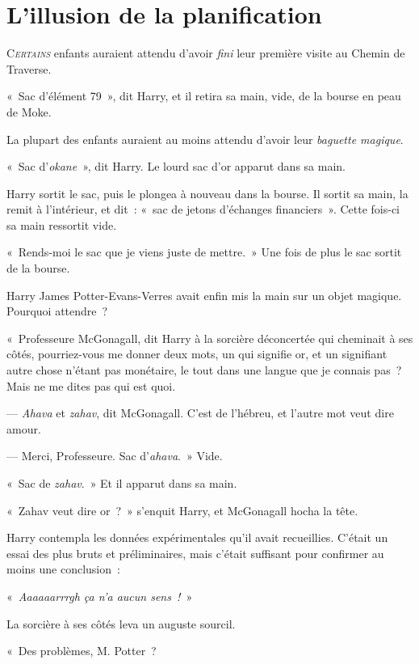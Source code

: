 
\chapter{L'illusion de la planification}

\lettrine{C}{\emph{ertains}} enfants auraient attendu d'avoir \emph{fini} leur première visite au Chemin de Traverse.

«~Sac d'élément 79~», dit Harry, et il retira sa main, vide, de la bourse en peau de Moke.

La plupart des enfants auraient au moins attendu d'avoir leur \emph{baguette magique}.

«~Sac d'\emph{okane}~», dit Harry. Le lourd sac d'or apparut dans sa main.

Harry sortit le sac, puis le plongea à nouveau dans la bourse. Il sortit sa main, la remit à l'intérieur, et dit~: «~sac de jetons d'échanges financiers~». Cette fois-ci sa main ressortit vide.

«~Rends-moi le sac que je viens juste de mettre.~» Une fois de plus le sac sortit de la bourse.

Harry James Potter-Evans-Verres avait enfin mis la main sur un objet magique. Pourquoi attendre~?

«~Professeure McGonagall, dit Harry à la sorcière déconcertée qui cheminait à ses côtés, pourriez-vous me donner deux mots, un qui signifie or, et un signifiant autre chose n'étant pas monétaire, le tout dans une langue que je connais pas~? Mais ne me dites pas qui est quoi.

--- \emph{Ahava} et \emph{zahav}, dit McGonagall. C'est de l'hébreu, et l'autre mot veut dire amour.

--- Merci, Professeure. Sac d'\emph{ahava}.~» Vide.

«~Sac de \emph{zahav}.~» Et il apparut dans sa main.

«~Zahav veut dire or~?~» s'enquit Harry, et McGonagall hocha la tête.

Harry contempla les données expérimentales qu'il avait recueillies.
C'était un essai des plus bruts et préliminaires, mais c'était suffisant pour confirmer au moins une conclusion~:

«~\emph{Aaaaaarrrgh ça n'a aucun sens~!}~»

La sorcière à ses côtés leva un auguste sourcil.

«~Des problèmes, M. Potter~?

